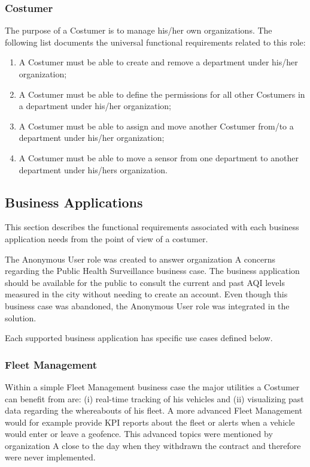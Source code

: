 \subsubsection{Costumer}
\label{subsubsec:requirements:functional:sensae:costumer}

The purpose of a Costumer is to manage his/her own organizations.
The following list documents the universal functional requirements related to this role:

\begin{enumerate}
    \item A Costumer must be able to create and remove a department under his/her organization;
    \item A Costumer must be able to define the permissions for all other Costumers in a department under his/her organization;
    \item A Costumer must be able to assign and move another Costumer from/to a department under his/her organization;
    \item A Costumer must be able to move a sensor from one department to another department under his/hers organization.
\end{enumerate}

\subsection{Business Applications}
\label{subsec:requirements:functional:services}

This section describes the functional requirements associated with each business application needs from the point of view of a costumer.

The Anonymous User role was created to answer organization A concerns regarding the Public Health Surveillance business case. The business application should be available for the public to consult the current and past \gls{AQI} levels measured in the city without needing to create an account. Even though this business case was abandoned, the Anonymous User role was integrated in the solution.

Each supported business application has specific use cases defined below.

\subsubsection{Fleet Management}
\label{subsubsec:requirements:functional:services:fleet}

Within a simple Fleet Management business case the major utilities a Costumer can benefit from are: (i) real-time tracking of his vehicles and (ii) visualizing past data regarding the whereabouts of his fleet. A more advanced Fleet Management would for example provide \gls{KPI} reports about the fleet or alerts when a vehicle would enter or leave a geofence. This advanced topics were mentioned by organization A close to the day when they withdrawn the contract and therefore were never implemented.

